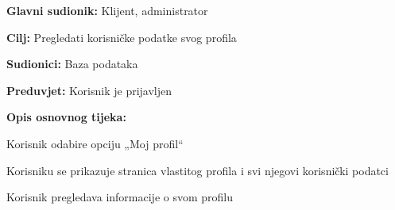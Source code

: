 						\begin{packed_item}
							
							\item \textbf{Glavni sudionik: } Klijent, administrator
							\item  \textbf{Cilj:} Pregledati korisničke podatke svog profila
							\item  \textbf{Sudionici:} Baza podataka
							\item  \textbf{Preduvjet:} Korisnik je prijavljen
							\item  \textbf{Opis osnovnog tijeka:}
							
							\item[] \begin{packed_enum}
								
								\item Korisnik odabire opciju „Moj profil“ 
								\item Korisniku se prikazuje stranica vlastitog profila i svi njegovi korisnički podatci   
								\item Korisnik pregledava informacije o svom profilu 
							 
							\end{packed_enum}
						\end{packed_item}
						\noindent {}
